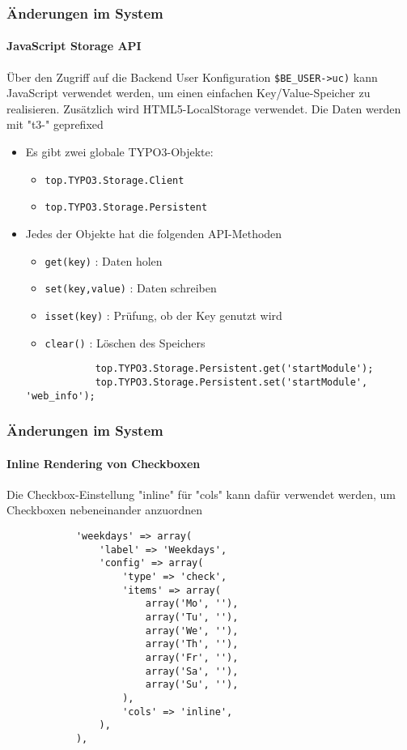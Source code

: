 \begin{frame}[fragile]
	\frametitle{Änderungen im System}
	\framesubtitle{JavaScript Storage API}

	Über den Zugriff auf die Backend User Konfiguration  \texttt{\$BE\_USER->uc)} kann JavaScript verwendet werden, um einen einfachen Key/Value-Speicher zu realisieren. Zusätzlich wird HTML5-LocalStorage verwendet. Die Daten werden mit "t3-" geprefixed
	\begin{itemize}
		\item Es gibt zwei globale TYPO3-Objekte:
		\begin{itemize}
			\item \texttt{top.TYPO3.Storage.Client}
			\item \texttt{top.TYPO3.Storage.Persistent}		
		\end{itemize}
		\item Jedes der Objekte hat die folgenden API-Methoden
		\begin{itemize}
			\item \texttt{get(key)} : Daten holen
			\item \texttt{set(key,value)} : Daten schreiben 
			\item \texttt{isset(key)} : Prüfung, ob der Key genutzt wird
			\item \texttt{clear()} : Löschen des Speichers
		\end{itemize}

		\begin{lstlisting}
			top.TYPO3.Storage.Persistent.get('startModule');
			top.TYPO3.Storage.Persistent.set('startModule', 'web_info');
		\end{lstlisting}

	\end{itemize}

\end{frame}


\begin{frame}[fragile]
	\frametitle{Änderungen im System}
	\framesubtitle{Inline Rendering von Checkboxen}

	Die Checkbox-Einstellung "inline" für "cols" kann dafür verwendet werden, um Checkboxen nebeneinander anzuordnen

		\begin{lstlisting}
			'weekdays' => array(
				'label' => 'Weekdays',
				'config' => array(
					'type' => 'check',
					'items' => array(
						array('Mo', ''),
						array('Tu', ''),
						array('We', ''),
						array('Th', ''),
						array('Fr', ''),
						array('Sa', ''),
						array('Su', ''),
					),
					'cols' => 'inline',
				),
			),
		\end{lstlisting}

\end{frame}

